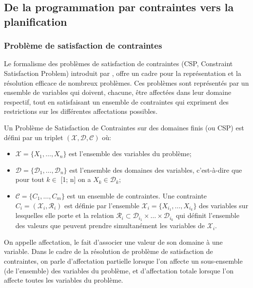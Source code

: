 \subsection{De la programmation par contraintes vers la planification}
\subsubsection{Problème de satisfaction de contraintes}
Le formalisme des problèmes de satisfaction de contraintes (CSP, Constraint Satisfaction Problem) introduit par \cite{montanari_networks_1974}, offre un cadre pour la représentation et la résolution efficace de nombreux problèmes. Ces problèmes sont représentés par un ensemble de variables qui doivent, chacune, être affectées dans leur domaine respectif, tout en satisfaisant un ensemble de contraintes qui expriment des restrictions sur les différentes affectations possibles.

\begin{definition} Un Problème de Satisfaction de Contraintes sur des domaines finis (ou CSP) est défini par un triplet $(\mathcal{X},\mathcal{D},\mathcal{C})$ où:
	\label{def:CSP}
\begin{itemize}
\item $\mathcal{X} = \{X_1, \dots, X_n \}$ est l'ensemble des variables du problème;
\item $\mathcal{D} = \{\mathcal{D}_1, \dots, \mathcal{D}_n \}$ est l'ensemble des domaines des variables, c'est-à-dire que pour tout $k \in$ [1; n] on a $X_k \in \mathcal{D}_k$;
\item $\mathcal{C} = \{C_1, \dots, C_m \}$ est un ensemble de contraintes. Une contrainte $C_i=(\mathcal{X}_i, \mathcal{R}_i)$ est définie par l'ensemble $\mathcal{X}_i = \{X_{i_1}, \dots, X_{i_k}\}$ des variables sur lesquelles elle porte et la relation $\mathcal{R}_i \subset \mathcal{D}_{i_1} \times \dots \times \mathcal{D}_{i_k}$ qui définit l'ensemble des valeurs que peuvent prendre simultanément les variables de $\mathcal{X}_i$.
\end{itemize}
\end{definition}

On appelle affectation, le fait d'associer une valeur de son domaine à une variable. Dans le cadre de la résolution de problème de satisfaction de contraintes, on parle d'affectation partielle lorsque l'on affecte un sous-ensemble (de l'ensemble) des variables du problème, et d'affectation totale lorsque l'on affecte toutes les variables du problème.

